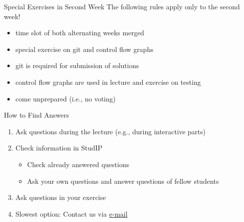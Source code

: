 \begin{frame}{\insertsubsection}
	\begin{fancycolumns}
		\begin{definition}{Special Exercises in Second Week}
			The following rules apply only to the second week!
			\begin{itemize}
				\item time slot of both alternating weeks merged
				\item special exercise on git and control flow graphs
				\item git is required for submission of solutions
				\item control flow graphs are used in lecture and exercise on testing
				\item come unprepared (i.e., no voting)
			\end{itemize}
		\end{definition}
		\nextcolumn
		\begin{note}{How to Find Answers}
			\begin{enumerate}
				\item<+-> Ask questions during the lecture (e.g., during interactive parts)
				\item<+-> Check information in StudIP
				\begin{itemize}
					\item Check already answered questions
					\item Ask your own questions and answer questions of fellow students
				\end{itemize}
				\item<+-> Ask questions in your exercise
				\item<+-> Slowest option: Contact us via  \href{mailto:christopher.rau@tu-braunschweig.de?cc=thomas.thuem@tu-braunschweig.de&subject=[SE1]}{e-mail}
			\end{enumerate}
		\end{note}
	\end{fancycolumns}
\end{frame}


